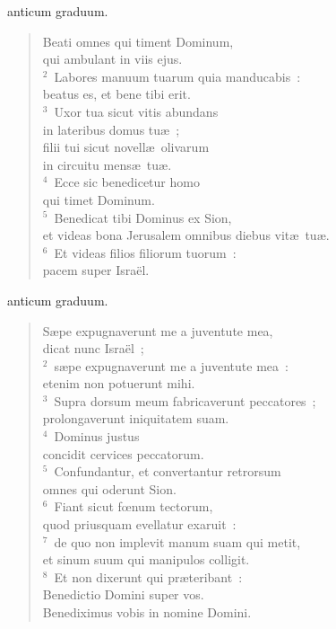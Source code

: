 \bchapter[Psalm]
anticum graduum. \begin{verse}Beati omnes qui timent Dominum,\\ qui ambulant in viis ejus.\\
${}^{2}$~Labores manuum tuarum quia manducabis~:\\ beatus es, et bene tibi erit.\\
${}^{3}$~Uxor tua sicut vitis abundans\\ in lateribus domus tu\ae~;\\ filii tui sicut novell\ae\ olivarum\\ in circuitu mens\ae\ tu\ae .\\
${}^{4}$~Ecce sic benedicetur homo\\ qui timet Dominum.\\
${}^{5}$~Benedicat tibi Dominus ex Sion,\\ et videas bona Jerusalem omnibus diebus vit\ae\ tu\ae .\\
${}^{6}$~Et videas filios filiorum tuorum~:\\ pacem super Isra\"el.\end{verse}



\bchapter[Psalm]
anticum graduum. \begin{verse}S\ae pe expugnaverunt me a juventute mea,\\ dicat nunc Isra\"el~;\\
${}^{2}$~s\ae pe expugnaverunt me a juventute mea~:\\ etenim non potuerunt mihi.\\
${}^{3}$~Supra dorsum meum fabricaverunt peccatores~;\\ prolongaverunt iniquitatem suam.\\
${}^{4}$~Dominus justus\\ concidit cervices peccatorum.\\
${}^{5}$~Confundantur, et convertantur retrorsum\\ omnes qui oderunt Sion.\\
${}^{6}$~Fiant sicut fœnum tectorum,\\ quod priusquam evellatur exaruit~:\\
${}^{7}$~de quo non implevit manum suam qui metit,\\ et sinum suum qui manipulos colligit.\\
${}^{8}$~Et non dixerunt qui pr\ae teribant~:\\ Benedictio Domini super vos.\\ Benediximus vobis in nomine Domini.\end{verse}



